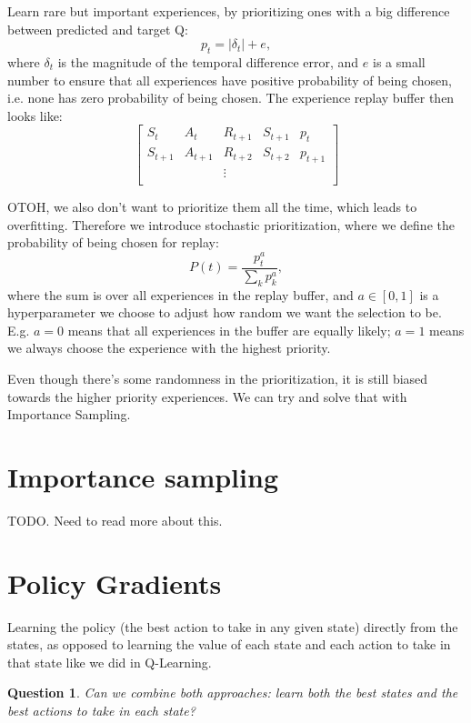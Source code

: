 \documentclass[17pt]{extarticle}
\theoremstyle{plain}
\newtheorem{question}[theorem]{Question}
\theoremstyle{definition}
\theoremstyle{remark}
\newcommand{\0}{\varnothing}
\newcommand{\<}{\langle}
\renewcommand{\>}{\rangle}
\begin{document}
Learn rare but important experiences, by prioritizing ones with a big difference between predicted and target Q: $$
p _ { t } = \left| \delta _ { t } \right| + e,
$$
where $ \delta_t $ is the magnitude of the temporal difference error, and $ e $ is a small number to ensure that all experiences have positive probability of being chosen, i.e. none has zero probability of being chosen. The experience replay buffer then looks like: $$
\begin{bmatrix}
S_t & A_t & R_{t+1} & S_{t+1} & p_t \\
S_{t+1} & A_{t+1} & R_{t+2} & S_{t+2} & p_{t+1} \\
& & \vdots & & \\
\end{bmatrix}
$$

OTOH, we also don't want to prioritize them all the time, which leads to overfitting. Therefore we introduce stochastic prioritization, where we define the probability of being chosen for replay: $$
P(t) = \frac{p_t^a}{\sum_k p_k^a},
$$
where the sum is over all experiences in the replay buffer, and $ a \in [0, 1] $ is a hyperparameter we choose to adjust how random we want the selection to be. E.g. $ a = 0 $ means that all experiences in the buffer are equally likely; $ a = 1 $ means we always choose the experience with the highest priority.

Even though there's some randomness in the prioritization, it is still biased towards the higher priority experiences. We can try and solve that with Importance Sampling.

\section{Importance sampling}

TODO. Need to read more about this.


\section{Policy Gradients}

Learning the policy (the best action to take in any given state) directly from the states, as opposed to learning the value of each state and each action to take in that state like we did in Q-Learning.

\begin{question}
  Can we combine both approaches: learn both the best states and the best actions to take in each state?
\end{question}
\end{document}
